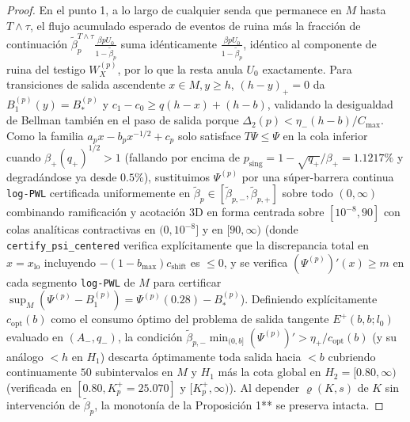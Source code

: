 \documentclass[11pt,letterpaper]{article}
\theoremstyle{plain}
\begin{document}
\begin{proof}
En el punto 1, a lo largo de cualquier senda que permanece en $M$ hasta $T\wedge\tau$, el flujo acumulado esperado de eventos de ruina más la fracción de continuación $\tilde{\beta}_p^{T\wedge\tau}\frac{\beta p U_0}{1-\tilde{\beta}_p}$ suma idénticamente $\frac{\beta p U_0}{1-\tilde{\beta}_p}$, idéntico al componente de ruina del testigo $W_X^{(p)}$, por lo que la resta anula $U_0$ exactamente. Para transiciones de salida ascendente $x\in M, y\ge h$, $(h-y)_+=0$ da $B_1^{(p)}(y)=B_*^{(p)}$ y $c_1-c_0\ge q(h-x)+(h-b)$, validando la desigualdad de Bellman también en el paso de salida porque $\Delta_2(p)<\eta_-(h-b)/C_{\max}$. Como la familia $a_p x - b_p x^{-1/2} + c_p$ solo satisface $T\Psi\le \Psi$ en la cola inferior cuando $\beta_+(q_+)^{1/2}>1$ (fallando por encima de $p_{\mathrm{sing}}=1-\sqrt{q_+}/\beta_+=1.1217\%$ y degradándose ya desde $0.5\%$), sustituimos $\Psi^{(p)}$ por una súper-barrera continua \texttt{log-PWL} certificada uniformemente en $\tilde{\beta}_p\in[\tilde{\beta}_{p,-},\tilde{\beta}_{p,+}]$ sobre todo $(0,\infty)$ combinando ramificación y acotación 3D en forma centrada sobre $[10^{-8},90]$ con colas analíticas contractivas en $(0,10^{-8}]$ y en $[90,\infty)$ (donde \texttt{certify\_psi\_centered} verifica explícitamente que la discrepancia total en $x=x_{\mathrm{lo}}$ incluyendo $-(1-b_{\max})c_{\mathrm{shift}}$ es $\le 0$, y se verifica $(\Psi^{(p)})'(x)\ge m$ en cada segmento \texttt{log-PWL} de $M$ para certificar $\sup_M(\Psi^{(p)}-B_1^{(p)})=\Psi^{(p)}(0.28)-B_*^{(p)}$). Definiendo explícitamente $c_{\mathrm{opt}}(b)$ como el consumo óptimo del problema de salida tangente $E^+(b,b;l_0)$ evaluado en $(A_-,q_-)$, la condición $\tilde{\beta}_{p,-}\min_{(0,b]}(\Psi^{(p)})' > \eta_+/c_{\mathrm{opt}}(b)$ (y su análogo $<h$ en $H_1$) descarta óptimamente toda salida hacia $<b$ cubriendo continuamente $50$ subintervalos en $M$ y $H_1$ más la cota global en $H_2=[0.80,\infty)$ (verificada en $[0.80,K_p^+=25.070]$ y $[K_p^+,\infty)$). Al depender $\varrho(K,s)$ de $K$ sin intervención de $\tilde{\beta}_p$, la monotonía de la Proposición 1** se preserva intacta.


\end{proof}
\end{document}
